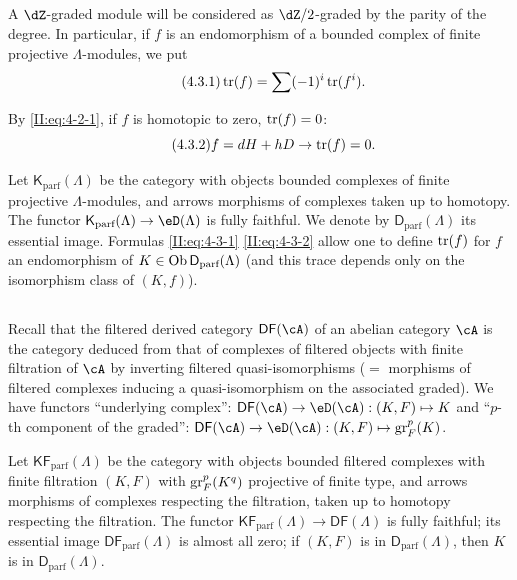 \subsection{}\label{II:4-3}

A $\dZ$-graded module will be considered as $\dZ/2$-graded by the
parity of the degree. In particular, if $f$ is an endomorphism of a bounded
complex of finite projective $\Lambda$-modules, we put
\begin{equation*}\tag{4.3.1}\label{II:eq:4-3-1}
  \operatorname{tr}(f) = \sum (-1)^i \operatorname{tr}(f^i) \text{.}
\end{equation*}

By \eqref{II:eq:4-2-1}, if $f$ is homotopic to zero, $\operatorname{tr}(f) = 0$:
\begin{equation*}\tag{4.3.2}\label{II:eq:4-3-2}
  f = d H + h D \rightarrow \operatorname{tr}(f) = 0 \text{.}
\end{equation*}

Let $\mathsf{K}_\text{parf}(\Lambda)$ be the category with objects bounded
complexes of finite projective $\Lambda$-modules, and arrows
morphisms of complexes taken up to homotopy. The functor
$\mathsf{K}_\text{parf}(\Lambda)\to\eD(\Lambda)$ is fully faithful. We denote
by $\mathsf{D}_\text{parf}(\Lambda)$ its essential image. Formulas
\eqref{II:eq:4-3-1} \eqref{II:eq:4-3-2} allow one to define $\operatorname{tr}(f)$ for $f$
an endomorphism of $K\in\operatorname{Ob} \mathsf{D}_\text{parf}(\Lambda)$ (and this trace
depends only on the isomorphism class of $(K,f)$).




\subsection{}\label{II:4-4}

Recall that the filtered derived category $\mathsf{DF}(\cA)$ of an abelian
category $\cA$ is the category deduced from that of complexes of
filtered objects with finite filtration of $\cA$ by inverting filtered
quasi-isomorphisms ($=$ morphisms of filtered complexes inducing a quasi-isomorphism
on the associated graded). We have functors ``underlying complex'':
$\mathsf{DF}(\cA)\to\eD(\cA): (K,F)\mapsto K$ and ``$p$-th component of the
graded'': $\mathsf{DF}(\cA)\to\eD(\cA): (K,F)\mapsto \gr_F^p(K)$.

Let $\mathsf{KF}_\text{parf}(\Lambda)$ be the category with objects bounded
filtered complexes with finite filtration $(K,F)$ with $\operatorname{gr}_F^p(K^q)$ projective
of finite type, and arrows morphisms of complexes respecting the
filtration, taken up to homotopy respecting the filtration. The functor
$\mathsf{KF}_\text{parf}(\Lambda)\to\mathsf{DF}(\Lambda)$ is fully faithful;
its essential image $\mathsf{DF}_\text{parf}(\Lambda)$ is almost all zero;
if $(K,F)$ is in $\mathsf{D}_\text{parf}(\Lambda)$, then $K$ is in
$\mathsf{D}_\text{parf}(\Lambda)$.

